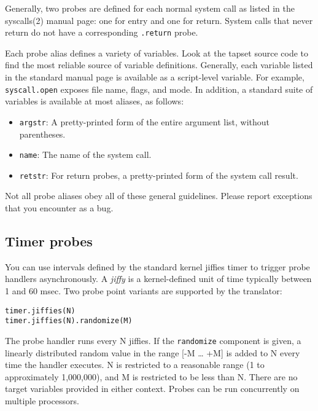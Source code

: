 \documentclass[twoside,english]{article}
\newenvironment{vindent}
{\begin{list}{}{\setlength{\listparindent}{6pt}}
\item[]}
{\end{list}}
\begin{document}
Generally, two probes are defined for each normal system call as
listed in the syscalls(2) manual page: one for entry and one for
return.   System calls that never return do not have a
corresponding \texttt{.return} probe.

Each probe alias defines a variety of variables. Look at the tapset
source code to find the most reliable source of variable definitions.
Generally, each variable listed in the standard manual page is
available as a script-level variable. For example,
\texttt{syscall.open} exposes file name, flags, and mode.  In addition,
a standard suite of variables is available at most aliases, as follows:

\begin{itemize}
\item \texttt{argstr}: A pretty-printed form of the entire argument
  list, without parentheses.
\item \texttt{name}: The name of the system call.
\item \texttt{retstr}: For return probes, a pretty-printed form of the
  system call result.
\end{itemize}

Not all probe aliases obey all of these general guidelines.  Please
report exceptions that you encounter as a bug.


\subsection{Timer probes}
You can use intervals defined by the standard kernel jiffies
timer to trigger probe handlers asynchronously. A \emph{jiffy} is a kernel-defined
unit of time typically between 1 and 60 msec. Two probe point variants are
supported by the translator:

\begin{vindent}
\begin{verbatim}
timer.jiffies(N)
timer.jiffies(N).randomize(M)
\end{verbatim}
\end{vindent}
The probe handler runs every N jiffies. If the \texttt{randomize}
component is given, a linearly distributed random value in the range {[}-M
\ldots{} +M] is added to N every time the handler executes. N is restricted
to a reasonable range (1 to approximately 1,000,000), and M is restricted
to be less than N. There are no target variables provided in either context.
Probes can be run concurrently on multiple processors.
\end{document}
